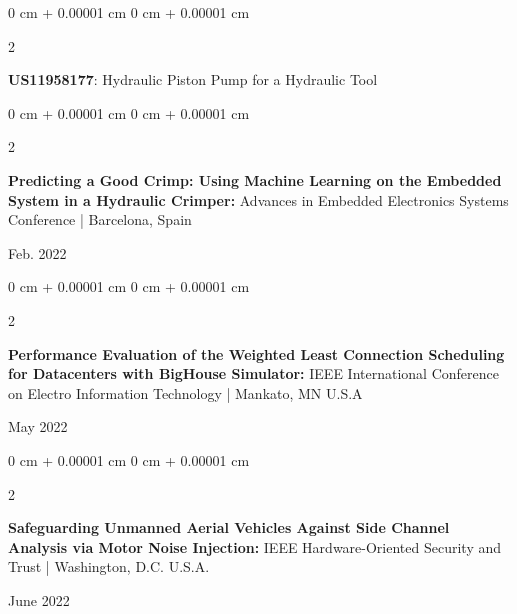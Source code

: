 \documentclass[10pt, letterpaper]{article}
\newenvironment{highlights}{
    \begin{itemize}[
        topsep=0.10 cm,
        parsep=0.10 cm,
        partopsep=0pt,
        itemsep=0pt,
        leftmargin=0 cm + 10pt
    ]
}{
    \end{itemize}
} %
\newenvironment{onecolentry}{
    \begin{adjustwidth}{
        0 cm + 0.00001 cm
    }{
        0 cm + 0.00001 cm
    }
}{
    \end{adjustwidth}
} %
\newenvironment{twocolentry}[2][]{
    \onecolentry
    \def\secondColumn{#2}
    \setcolumnwidth{\fill, 4.5 cm}
    \begin{paracol}{2}
}{
    \switchcolumn \raggedleft \secondColumn
    \end{paracol}
    \endonecolentry
} %
\begin{document}
\begin{samepage}
            \begin{twocolentry}{
                2019
            }
                \textbf{US11958177}: Hydraulic Piston Pump for a Hydraulic Tool
            \end{twocolentry}

            \vspace{0.30 cm}

            \begin{twocolentry}{
                Feb. 2022
            }
                \textbf{Predicting a Good Crimp: Using Machine Learning on the Embedded System in a Hydraulic Crimper:} Advances in Embedded Electronics Systems Conference | Barcelona, Spain
            \end{twocolentry}
            \vspace{0.1 cm}
            \begin{twocolentry}{
                May 2022
            }
                \textbf{Performance Evaluation of the Weighted Least Connection Scheduling for Datacenters with BigHouse Simulator:} IEEE International Conference on Electro Information Technology | Mankato, MN U.S.A
            \end{twocolentry}
            \vspace{0.1 cm}
            \begin{twocolentry}{
                June 2022
            }
                \textbf{Safeguarding Unmanned Aerial Vehicles Against Side Channel Analysis via Motor Noise Injection:} IEEE Hardware-Oriented Security and Trust | Washington, D.C. U.S.A.
            \end{twocolentry}
            \vspace{0.10 cm}
        \end{samepage}
    


\end{document}
